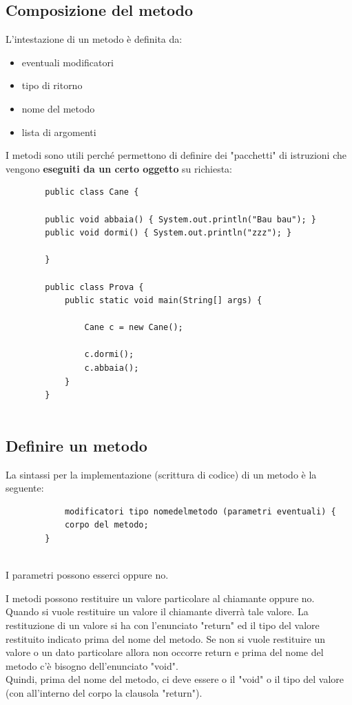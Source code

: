 \documentclass[a4paper,12 pt]{article}
\begin{document}
	\subsection{Composizione del metodo}
		L'intestazione di un metodo è definita da:
		\begin{itemize}
			\item eventuali modificatori
			\item tipo di ritorno
			\item nome del metodo
			\item lista di argomenti
		\end{itemize}
		I metodi sono utili perché permettono di definire dei "pacchetti" di istruzioni che vengono \textbf{eseguiti da un certo oggetto} su richiesta:
		
		\begin{lstlisting}
		public class Cane {
			
		public void abbaia() { System.out.println("Bau bau"); }
		public void dormi() { System.out.println("zzz"); }
			
		}
		
		public class Prova {
			public static void main(String[] args) {
			
			 	Cane c = new Cane();
			 	
				c.dormi();
				c.abbaia();
			}
		}
		
		\end{lstlisting}
	\subsection{Definire un metodo}
		La sintassi per la implementazione (scrittura di codice) di un metodo è la seguente:
		\begin{lstlisting}
			modificatori tipo nomedelmetodo (parametri eventuali) {
			corpo del metodo;
		}
	
		\end{lstlisting}
		
		I parametri possono esserci oppure no.
		
		\noindent I metodi possono restituire un valore particolare al chiamante oppure no.\\ Quando si vuole restituire un valore il chiamante diverrà tale valore. La restituzione di un valore si ha con l'enunciato "return" ed il tipo del valore restituito indicato prima del nome del metodo. Se non si vuole restituire un valore o un dato particolare allora non occorre return e prima del nome del metodo c'è bisogno dell'enunciato "void". \\ Quindi, prima del nome del metodo, ci deve essere o il "void" o il tipo del valore (con all'interno del corpo la clausola "return").
		
\end{document}
